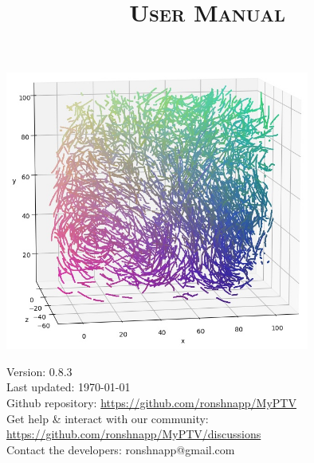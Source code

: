 \documentclass[10pt,a4paper]{article}
\title{\Huge \sffamily \textsc{\textbf{User Manual}}}
\author{}%
\date{}
\begin{document}
	
	


	
\maketitle

\thispagestyle{empty}
\vspace{2.5cm}

\begin{center}
	\includegraphics[width=10cm]{traj_image.jpg}
\end{center}

\vfill

\begin{minipage}{14cm}
	{\small \sffamily
	Version: 0.8.3 \\
	Last updated: \today \\
	Github repository: \url{https://github.com/ronshnapp/MyPTV} \\
	Get help \& interact with our community: \url{https://github.com/ronshnapp/MyPTV/discussions}\\
	Contact the developers: ronshnapp@gmail.com}
\end{minipage}



\newpage
\tableofcontents
{}
\newpage









\end{document}
